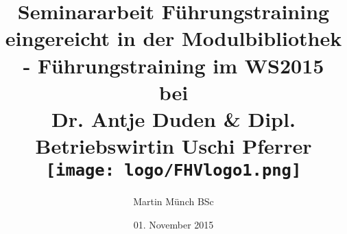 \title{
	{Seminararbeit Führungstraining}\\
	{\large eingereicht in der Modulbibliothek - Führungstraining im WS2015}\\
	{\large bei}\\
	{\large Dr. Antje Duden \& Dipl. Betriebswirtin Uschi Pferrer}\\ [1cm]
	{\texttt{[image: logo/FHVlogo1.png]}} \\ [1cm]
}
\author{Martin Münch BSc}
\date{01. November 2015}



\maketitle

